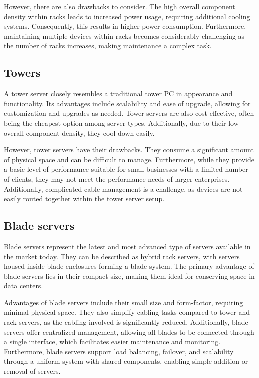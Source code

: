 However, there are also drawbacks to consider. The high overall component density within racks leads to increased power usage, requiring additional cooling systems. 
Consequently, this results in higher power consumption. 
Furthermore, maintaining multiple devices within racks becomes considerably challenging as the number of racks increases, making maintenance a complex task.

\subsection{Towers}
A tower server closely resembles a traditional tower PC in appearance and functionality.
Its advantages include scalability and ease of upgrade, allowing for customization and upgrades as needed. 
Tower servers are also cost-effective, often being the cheapest option among server types. 
Additionally, due to their low overall component density, they cool down easily.

However, tower servers have their drawbacks. 
They consume a significant amount of physical space and can be difficult to manage. 
Furthermore, while they provide a basic level of performance suitable for small businesses with a limited number of clients, they may not meet the performance needs of larger enterprises.
Additionally, complicated cable management is a challenge, as devices are not easily routed together within the tower server setup.

\subsection{Blade servers}
Blade servers represent the latest and most advanced type of servers available in the market today. 
They can be described as hybrid rack servers, with servers housed inside blade enclosures forming a blade system. 
The primary advantage of blade servers lies in their compact size, making them ideal for conserving space in data centers.

Advantages of blade servers include their small size and form-factor, requiring minimal physical space. 
They also simplify cabling tasks compared to tower and rack servers, as the cabling involved is significantly reduced. 
Additionally, blade servers offer centralized management, allowing all blades to be connected through a single interface, which facilitates easier maintenance and monitoring. 
Furthermore, blade servers support load balancing, failover, and scalability through a uniform system with shared components, enabling simple addition or removal of servers.

